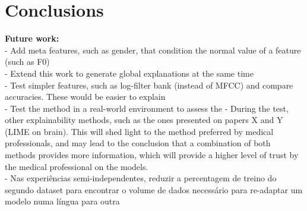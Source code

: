 
\chapter{Conclusions}
\label{ch:magna}



\textbf{Future work: }\\
 - Add meta features, such as gender, that condition the normal value of a feature (such as F0) \\
 - Extend this work to generate global explanations at the same time \\
 - Test simpler features, such as log-filter bank (instead of MFCC) and compare accuracies. These would be easier to explain \\
 - Test the method in a real-world environment to assess the 
 - During the test, other explainability methods, such as the ones presented on papers X and Y (LIME on brain). This will shed light to the method preferred by medical professionals, and may lead to the conclusion that a combination of both methods provides more information, which will provide a higher level of trust by the medical professional on the models.\\
 - Nas experiências semi-independentes, reduzir a percentagem de treino do segundo dataset para encontrar o volume de dados necessário para re-adaptar um modelo numa língua para outra \\

